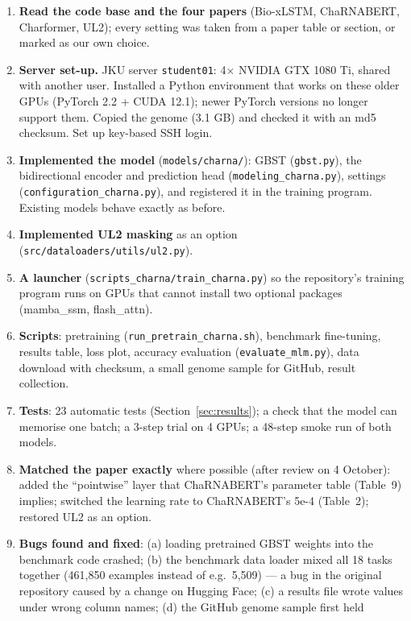 \documentclass[11pt,a4paper]{article}
\newcommand{\code}[1]{\texttt{\small #1}}
\begin{document}
\begin{enumerate}[leftmargin=*]
\item \textbf{Read the code base and the four papers} (Bio-xLSTM, ChaRNABERT, Charformer, UL2);
  every setting was taken from a paper table or section, or marked as our own choice.
\item \textbf{Server set-up.} JKU server \code{student01}: 4$\times$ NVIDIA GTX 1080 Ti, shared with
  another user. Installed a Python environment that works on these older GPUs (PyTorch 2.2 +
  CUDA 12.1); newer PyTorch versions no longer support them. Copied the genome (3.1 GB) and checked
  it with an md5 checksum. Set up key-based SSH login.
\item \textbf{Implemented the model} (\code{models/charna/}): GBST (\code{gbst.py}), the
  bidirectional encoder and prediction head (\code{modeling\_charna.py}), settings
  (\code{configuration\_charna.py}), and registered it in the training program. Existing models
  behave exactly as before.
\item \textbf{Implemented UL2 masking} as an option (\code{src/dataloaders/utils/ul2.py}).
\item \textbf{A launcher} (\code{scripts\_charna/train\_charna.py}) so the repository's training
  program runs on GPUs that cannot install two optional packages (mamba\_ssm, flash\_attn).
\item \textbf{Scripts}: pretraining (\code{run\_pretrain\_charna.sh}), benchmark fine-tuning,
  results table, loss plot, accuracy evaluation (\code{evaluate\_mlm.py}), data download with
  checksum, a small genome sample for GitHub, result collection.
\item \textbf{Tests}: 23 automatic tests (Section~\ref{sec:results}); a check that the model can
  memorise one batch; a 3-step trial on 4 GPUs; a 48-step smoke run of both models.
\item \textbf{Matched the paper exactly} where possible (after review on 4 October): added the
  ``pointwise'' layer that ChaRNABERT's parameter table (Table~9) implies; switched the learning
  rate to ChaRNABERT's 5e-4 (Table~2); restored UL2 as an option.
\item \textbf{Bugs found and fixed}: (a) loading pretrained GBST weights into the benchmark code
  crashed; (b) the benchmark data loader mixed all 18 tasks together (461,850 examples instead
  of e.g.\ 5,509) --- a bug in the original repository caused by a change on Hugging Face; (c) a
  results file wrote values under wrong column names; (d) the GitHub genome sample first held

\end{enumerate}
\end{document}
